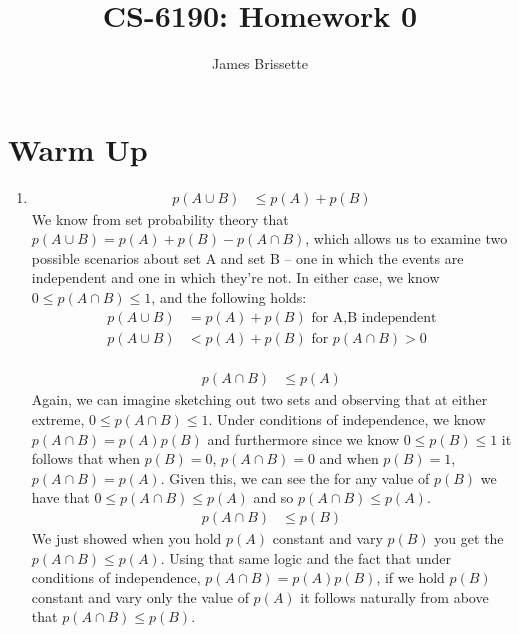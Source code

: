 \documentclass[11pt,a4paper]{article}
\author{James Brissette}
\title{CS-6190: Homework 0}
\begin{document}
	\maketitle
	
	\section{Warm Up}
		\begin{enumerate}
			\item
			\begin{align*}
				p(A \cup B) &\leq p(A) + p(B)
			\end{align*}
			We know from set probability theory that $p(A \cup B) = p(A) + p(B) - p(A \cap B)$, which allows us to examine two possible scenarios about set A and set B -- one in which the events are independent and one in which they're not. In either case, we know $0 \leq p(A \cap B) \leq 1$, and the following holds:
			\begin{align*} 
				p(A \cup B) &= p(A) + p(B) \text{ for A,B independent} \\
				p(A \cup B) &< p(A) + p(B) \text{ for $p(A \cap B) > 0$}
			\end{align*}
			\\
			\begin{align*}
				p(A \cap B) &\leq p(A)
			\end{align*}
			Again, we can imagine sketching out two sets and observing that at either extreme, $0 \leq p(A \cap B) \leq 1$. Under conditions of independence, we know $p(A \cap B) = p(A)p(B)$ and furthermore since we know $0 \leq p(B) \leq 1$ it follows that when $p(B) = 0$, $p(A \cap B) = 0$ and when $p(B) = 1$, $p(A \cap B) = p(A)$. Given this, we can see the for any value of $p(B)$ we have that $0 \leq p(A \cap B) \leq p(A)$ and so $p(A \cap B) \leq p(A)$.
			\begin{align*}
				p(A \cap B) &\leq p(B)
			\end{align*}
			We just showed when you hold $p(A)$ constant and vary $p(B)$ you get the $p(A \cap B) \leq p(A)$. Using that same logic and the fact that under conditions of independence, $p(A \cap B) = p(A)p(B)$, if we hold $p(B)$ constant and vary only the value of $p(A)$ it follows naturally from above that $p(A \cap B) \leq p(B)$.
		

\end{enumerate}
\end{document}
